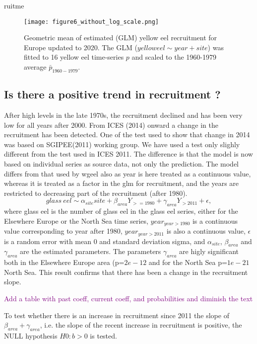 ruitme\documentclass[pdftex,11pt,a4paper]{report}
\begin{document}
\begin{figure}[H]
\centering
\texttt{[image: figure6\_without\_log\_scale.png]}
\caption {Geometric mean of estimated (GLM) yellow eel recruitment for Europe updated to 2020. The GLM ($yellow eel \sim year+site$) was fitted to
16 yellow eel time-series $p$ and scaled to the
1960-1979 average $\bar{p}_{1960-1979}$.}
\label{figure6}
\end{figure}

\subsection{Is there a positive trend in recruitment ?}
After high levels in the late 1970s, the recruitment declined and has been very
low for all years after 2000. From ICES (2014) onward a change in the
recruitment has been detected. One of the test used to show that change in 2014
was based on SGIPEE(2011) working group. We have used a test only slighly
different from the test used in ICES 2011. The difference is that the model is
now based on individual series as source data, not only the prediction. The model differs from that used by
wgeel also as year is here treated as a continuous value, whereas it is treated
as a factor in the glm for recruitment, and the years are restricted to
decreasing part of the recruitment (after 1980).
\begin{equation}
glass~eel \sim  \alpha_{site} site + \beta_{area} Y_{>=1980} + \gamma_{area} Y_{>2011} + \epsilon,
\end{equation}
where glass eel is the number of glass eel in the glass eel series, either for the Elsewhere Europe or the North Sea time series, $year_{year>1980}$
is a continuous value corresponding to year after 1980, $year_{year>2011}$ is also
a continuous value, $\epsilon$ is a random error with mean 0 and standard deviation sigma, 
and $\alpha_{site}$, $\beta_{area}$ and $\gamma_{area}$ are the estimated
parameters. The parameters $\gamma_{area}$ are higly significant both in the
Elsewhere Europe area (p=$2e-12$
and for the North Sea p=$1e-21$ North Sea.
This result confirms that there has been a change in the recruitment slope.

\textcolor{purple}{Add a table with past coeff, current coeff, and probabilities and diminish the text}

To test whether there is an increase in recruitment since 2011 the slope of
$\beta_{area}+\gamma_{area}$, i.e. the slope of the recent increase in
recruitment is positive, the NULL hypothesis $H0:b>0$ is tested.
\end{document}
